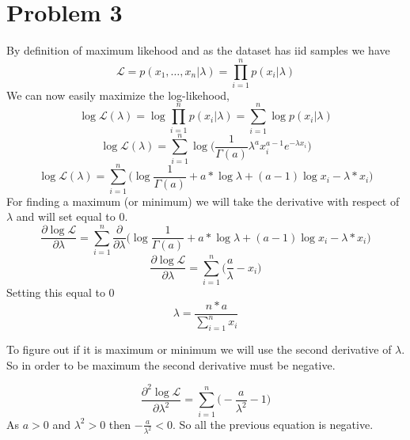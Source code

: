\section{Problem 3}
By definition of maximum likehood and as the dataset has iid samples we have\\
\begin{equation*}
\mathcal{L} = p(x_1,\dots,x_n|\lambda) = \prod_{i=1}^n p(x_i|\lambda)
\end{equation*}
We can now easily maximize the log-likehood, 
\begin{equation*}
\log \mathcal{L}(\lambda) = \log\prod_{i=1}^n p(x_i|\lambda)=\sum_{i=1}^n \log p(x_i|\lambda)
\end{equation*}
\begin{equation*}
\log \mathcal{L}(\lambda) = \sum_{i=1}^n \log \biggl( \frac{1}{\Gamma(a)} \lambda^a x_i^{a-1} e^{-\lambda x_i} \biggr)
\end{equation*}
\begin{equation*}
\log \mathcal{L}(\lambda) = \sum_{i=1}^n \biggl( \log\frac{1}{\Gamma(a)} + a*\log\lambda + (a-1)\log{x_i} - \lambda*x_i \biggr)
\end{equation*}
For finding a maximum (or minimum) we will take the derivative with respect of $\lambda$ and will set equal to 0.
\begin{equation*}
\frac{\partial\log\mathcal{L}}{\partial\lambda} = \sum_{i=1}^n \frac{\partial}{\partial\lambda} \biggl( \log\frac{1}{\Gamma(a)} + a*\log\lambda + (a-1)\log{x_i} - \lambda*x_i \biggr)
\end{equation*}
\begin{equation*}
\frac{\partial\log\mathcal{L}}{\partial\lambda} = \sum_{i=1}^n \biggl( \frac{a}{\lambda} - x_i \biggr)
\end{equation*}
Setting this equal to 0
\begin{equation*}
\lambda = \frac{n*a}{\sum_{i=1}^n x_i}
\end{equation*}

To figure out if it is maximum or minimum we will use the second derivative of $\lambda$.
So in order to be maximum the second derivative must be negative.

\begin{equation*}
\frac{\partial^2\log\mathcal{L}}{\partial\lambda^2} = \sum_{i=1}^n \biggl( -\frac{a}{\lambda^2} -1 \biggr)
\end{equation*}
As $ a > 0 $ and $\lambda^2 > 0$ then $-\frac{a}{\lambda^2} < 0$. So all the previous equation is negative.
